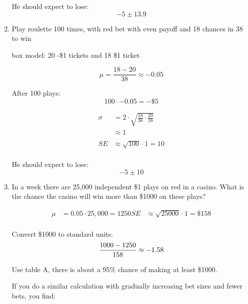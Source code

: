 \documentclass[portrait]{exam}
\begin{document}
\begin{enumerate}
\begin{solution}
        He should expect to lose:
        \[
          -5 \pm 13.9
        \]

      \end{solution}
    \item Play roulette 100 times, with red bet with even payoff and 18
      chances in 38 to win

      \begin{solution}
        box model: 20 -\$1 tickets and 18 \$1 ticket

        \[
          \mu = \frac{18 - 20}{38} \approx -0.05
        \]

        After 100 plays:
        \[
          100 \cdot -0.05 = -\$5
        \]

        \begin{align*}
          \sigma & = 2 \cdot \sqrt{\frac{18}{38} \cdot \frac{20}{38}} \\
                 & \approx 1 \\
          \\
          SE     & \approx \sqrt{100} \cdot 1 = 10 \\
        \end{align*}

        He should expect to lose:
        \[
          -5 \pm 10
        \]
      \end{solution}

    \item In a week there are 25,000 independent \$1 plays on red in a casino.
      What is the chance the casino will win more than \$1000 on these plays?

      \begin{solution}
        \begin{align*}
          \mu & = 0.05 \cdot 25,000 = 1250
          SE  & \approx \sqrt{25000} \cdot 1 = \$158 \\
        \end{align*}

        Convert \$1000 to standard units:
        \[
          \frac{1000 - 1250}{158} \approx -1.58 \\
        \]

        Use table A, there is about a 95\% chance of making at least \$1000.

        If you do a similar calculation with gradually increasing bet sizes and
        fewer bets, you find:


\end{solution}
\end{enumerate}
\end{document}
